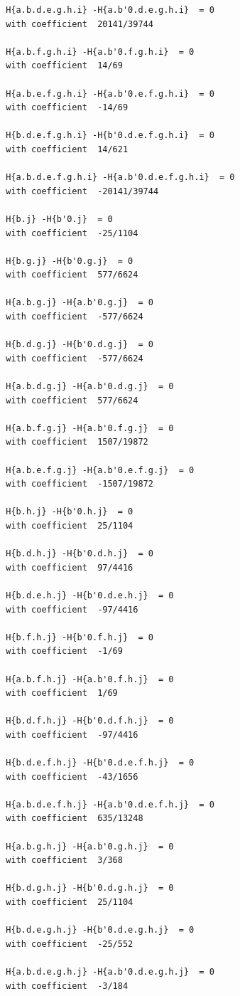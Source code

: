 \documentclass[11pt, a4paper]{kybernetika}
\begin{document}
\begin{verbatim}
		H{a.b.d.e.g.h.i} -H{a.b'0.d.e.g.h.i}  = 0
		with coefficient  20141/39744
		
		H{a.b.f.g.h.i} -H{a.b'0.f.g.h.i}  = 0
		with coefficient  14/69
		
		H{a.b.e.f.g.h.i} -H{a.b'0.e.f.g.h.i}  = 0
		with coefficient  -14/69
		
		H{b.d.e.f.g.h.i} -H{b'0.d.e.f.g.h.i}  = 0
		with coefficient  14/621
		
		H{a.b.d.e.f.g.h.i} -H{a.b'0.d.e.f.g.h.i}  = 0
		with coefficient  -20141/39744
		
		H{b.j} -H{b'0.j}  = 0
		with coefficient  -25/1104
		
		H{b.g.j} -H{b'0.g.j}  = 0
		with coefficient  577/6624
		
		H{a.b.g.j} -H{a.b'0.g.j}  = 0
		with coefficient  -577/6624
		
		H{b.d.g.j} -H{b'0.d.g.j}  = 0
		with coefficient  -577/6624
		
		H{a.b.d.g.j} -H{a.b'0.d.g.j}  = 0
		with coefficient  577/6624
		
		H{a.b.f.g.j} -H{a.b'0.f.g.j}  = 0
		with coefficient  1507/19872
		
		H{a.b.e.f.g.j} -H{a.b'0.e.f.g.j}  = 0
		with coefficient  -1507/19872
		
		H{b.h.j} -H{b'0.h.j}  = 0
		with coefficient  25/1104
		
		H{b.d.h.j} -H{b'0.d.h.j}  = 0
		with coefficient  97/4416
		
		H{b.d.e.h.j} -H{b'0.d.e.h.j}  = 0
		with coefficient  -97/4416
		
		H{b.f.h.j} -H{b'0.f.h.j}  = 0
		with coefficient  -1/69
		
		H{a.b.f.h.j} -H{a.b'0.f.h.j}  = 0
		with coefficient  1/69
		
		H{b.d.f.h.j} -H{b'0.d.f.h.j}  = 0
		with coefficient  -97/4416
		
		H{b.d.e.f.h.j} -H{b'0.d.e.f.h.j}  = 0
		with coefficient  -43/1656
		
		H{a.b.d.e.f.h.j} -H{a.b'0.d.e.f.h.j}  = 0
		with coefficient  635/13248
		
		H{a.b.g.h.j} -H{a.b'0.g.h.j}  = 0
		with coefficient  3/368
		
		H{b.d.g.h.j} -H{b'0.d.g.h.j}  = 0
		with coefficient  25/1104
		
		H{b.d.e.g.h.j} -H{b'0.d.e.g.h.j}  = 0
		with coefficient  -25/552
		
		H{a.b.d.e.g.h.j} -H{a.b'0.d.e.g.h.j}  = 0
		with coefficient  -3/184
		

\end{verbatim}
\end{document}

